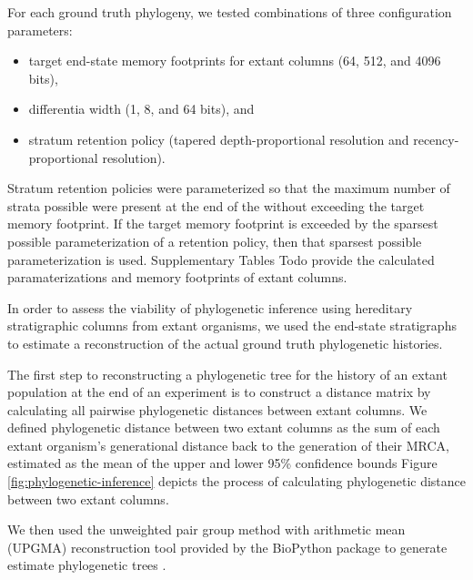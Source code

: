 For each ground truth phylogeny, we tested combinations of three configuration parameters:
\begin{itemize}
  \item target end-state memory footprints for extant columns (64, 512, and 4096 bits),
  \item differentia width (1, 8, and 64 bits), and
  \item stratum retention policy (tapered depth-proportional resolution and recency-proportional resolution).
\end{itemize}

Stratum retention policies were parameterized so that the maximum number of strata possible were present at the end of the without exceeding the target memory footprint.
If the target memory footprint is exceeded by the sparsest possible parameterization of a retention policy, then that sparsest possible parameterization is used.
Supplementary Tables Todo provide the calculated paramaterizations and memory footprints of extant columns.

In order to assess the viability of phylogenetic inference using hereditary stratigraphic columns from extant organisms, we used the end-state stratigraphs to estimate a reconstruction of the actual ground truth phylogenetic histories.



The first step to reconstructing a phylogenetic tree for the history of an extant population at the end of an experiment is to construct a distance matrix by calculating all pairwise phylogenetic distances between extant columns.
We defined phylogenetic distance between two extant columns as the sum of each extant organism's generational distance back to the generation of their MRCA, estimated as the mean of the upper and lower 95\% confidence bounds
Figure \ref{fig:phylogenetic-inference} depicts the process of calculating phylogenetic distance between two extant columns.

We then used the unweighted pair group method with arithmetic mean (UPGMA) reconstruction tool provided by the BioPython package to generate estimate phylogenetic trees \citep{cock2009biopython,sokal1958statistical}.

